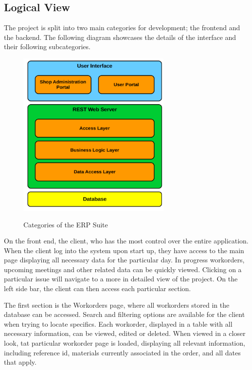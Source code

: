 {{{{{\subsection{Logical View}
The project is split into two main categories for development; the frontend and the backend. The following diagram showcases the details of the interface and their following subcategories. 
\begin{figure}[h]
	\centering
	\includegraphics[width=3in]{front-back.png}\\
	\caption{Categories of the ERP Suite}
	\label{fig:tobias}
\end{figure}
\newline

On the front end, the client, who has the most control over the entire application. When the client log into the system upon start up, they have access to the main page displaying all necessary data for the particular day. In progress workorders, upcoming meetings and other related data can be quickly viewed. Clicking on a particular issue will navigate to a more in detailed view of the project. On the left side bar, the client can then access each particular section. 
\newline
{\setlength{\parindent}{0cm}

The first section is the Workorders page, where all workorders stored in the database can be accessed. Search and filtering options are available for the client when trying to locate specifics. Each workorder, displayed in a table with all necessary information, can be viewed, edited or deleted. When viewed in a closer look, tat particular workorder page is loaded, displaying all relevant information, including reference id, materials currently associated in the order, and all dates that apply. 
\newline
{\setlength{\parindent}{0cm}

}}}}}}}
